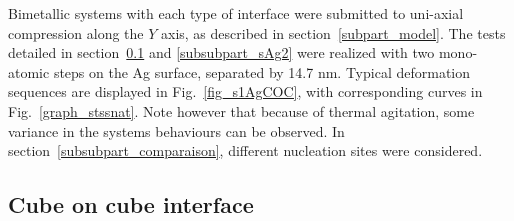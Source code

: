 \documentclass[final,3p,times,twocolumn]{elsarticle}
\begin{document}
Bimetallic systems with each type of interface were submitted to uni-axial compression along the $Y$ axis, as described in section~\ref{subpart_model}. The tests detailed in section~\ref{subsubpart_sAg} and \ref{subsubpart_sAg2} were realized with two mono-atomic steps on the Ag surface, separated by 14.7 nm. 
Typical deformation sequences are displayed in Fig.~\ref{fig_s1AgCOC}, with corresponding curves in Fig.~\ref{graph_stssnat}. Note however that because of thermal agitation, some variance in the systems behaviours can be observed.
In section~\ref{subsubpart_comparaison}, different nucleation sites were considered.

 
	\subsection{Cube on cube interface}\label{subsubpart_sAg}
    
\end{document}
